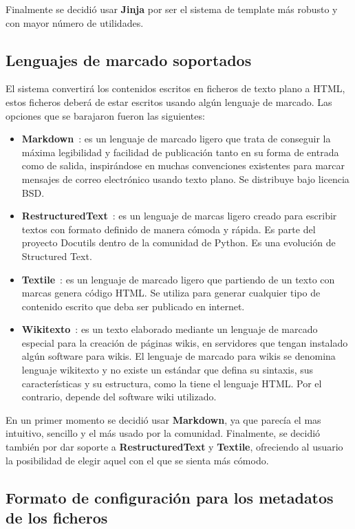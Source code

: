 Finalmente se decidió usar \textbf{Jinja} por ser el sistema de template más robusto y con mayor número de utilidades.

\subsection{Lenguajes de marcado soportados}

El sistema convertirá los contenidos escritos en ficheros de texto plano a HTML, estos ficheros deberá de estar escritos
usando algún lenguaje de marcado. Las opciones que se barajaron fueron las siguientes:

\begin{itemize}
\item \textbf{Markdown}~\cite{markdown}: es un lenguaje de marcado ligero que trata de conseguir la máxima legibilidad y facilidad
de publicación tanto en su forma de entrada como de salida, inspirándose en muchas convenciones existentes para marcar mensajes
de correo electrónico usando texto plano. Se distribuye bajo licencia BSD.
\item \textbf{RestructuredText}~\cite{restructuredtext}: es un lenguaje de marcas ligero creado para escribir textos con formato definido de manera cómoda
y rápida. Es parte del proyecto Docutils dentro de la comunidad de Python. Es una evolución de Structured Text.
\item \textbf{Textile}~\cite{textile}: es un lenguaje de marcado ligero que partiendo de un texto con marcas genera código HTML.
Se utiliza para generar cualquier tipo de contenido escrito que deba ser publicado en internet.
\item \textbf{Wikitexto}~\cite{wikitexto}: es un texto elaborado mediante un lenguaje de marcado especial para la creación de páginas wikis,
en servidores que tengan instalado algún software para wikis. El lenguaje de marcado para wikis se denomina lenguaje wikitexto
y no existe un estándar que defina su sintaxis, sus características y su estructura, como la tiene el lenguaje HTML. Por el
contrario, depende del software wiki utilizado.
\end{itemize}

En un primer momento se decidió usar \textbf{Markdown}, ya que parecía el mas intuitivo, sencillo y el más usado por la comunidad. Finalmente,
se decidió también por dar soporte a \textbf{RestructuredText} y \textbf{Textile}, ofreciendo al usuario la posibilidad de elegir aquel
con el que se sienta más cómodo.

\subsection{Formato de configuración para los metadatos de los ficheros}

